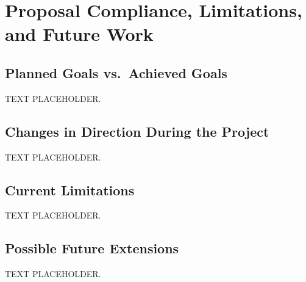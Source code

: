 \chapter{Proposal Compliance, Limitations, and Future Work}

\section{Planned Goals vs.\ Achieved Goals}

TEXT PLACEHOLDER.

\section{Changes in Direction During the Project}

TEXT PLACEHOLDER.

\section{Current Limitations}

TEXT PLACEHOLDER.

\section{Possible Future Extensions}

TEXT PLACEHOLDER.